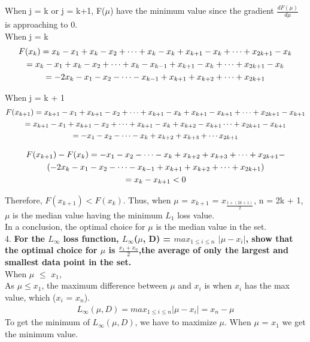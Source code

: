 \documentclass{article}
\begin{document}
When j = k or j = k+1, F($\mu$) have the minimum value since the gradient $\frac{dF(\mu)}{d\mu}$ is approaching to 0. \\

When j = k \begin{gather}
F(x_k) = x_k - x_1 + x_k - x_2 + \cdots + x_k - x_k + x_{k+1} - x_k + \cdots + x_{2k+1} - x_k \notag\\
= x_k - x_1 + x_k - x_2 + \cdots + x_k - x_{k-1} + x_{k+1} - x_k + \cdots + x_{2k+1} - x_k \notag\\
= -2x_k - x_1 - x_2 - \cdots - x_{k-1} + x_{k+1} + x_{k+2} + \cdots + x_{2k+1}
\end{gather}

When j = k + 1 \begin{gather}
F(x_{k+1}) = x_{k+1} - x_1 + x_{k+1} - x_2 + \cdots + x_{k+1} - x_{k} + x_{k+1} - x_{k+1} + \cdots + x_{2k+1} - x_{k+1} \notag\\
= x_{k+1} - x_1 + x_{k+1} - x_2 + \cdots + x_{k+1} - x_{k} + x_{k+2} - x_{k+1} \cdots + x_{2k+1} - x_{k+1} \notag\\
= -x_1 - x_2 -\cdots -x_k + x_{k+2} + x_{k+3} + \cdots x_{2k+1} 
\end{gather} 

\begin{gather}
F(x_{k+1}) - F(x_k) = -x_1 - x_2 -\cdots -x_k + x_{k+2} + x_{k+3} + \cdots + x_{2k+1}  - \notag\\(-2x_k - x_1 - x_2 - \cdots - x_{k-1} + x_{k+1} + x_{k+2}  + \cdots + x_{2k+1}) \\ = x_k - x_{k+1} <0
\end{gather}

Therefore, $F(x_{k+1}) < F(x_{k})$. Thus, when $\mu$ = $x_{k+1}$ = $x_{\frac{1+(2k+1)}{2}}$, n = 2k + 1, $\mu$ is the median value having the minimum $L_1$ loss value. \\
In a conclusion, the optimal choice for $\mu$ is the median value in the set.\\

4. \textbf{For the $L_{\infty}$ loss function, $L_{\infty}$($\mu$, D) = $max_{1 \leq i \leq n}$ $|\mu - x_i|$, show that the optimal choice for $\mu$ is $\frac{x_1+x_n}{2}$,the average of only the largest and smallest data point in the set.}\\

When $\mu$ $\leq$ $x_1$, \\
As $\mu \leq x_1$, the maximum difference between $\mu$ and $x_i$ is when $x_i$ has the max value, which ($x_i$ = $x_n$). 
\begin{gather}
L_{\infty} (\mu,D) = max_{1 \leq i \leq n} |\mu - x_i| = x_n - \mu
\end{gather}
To get the minimum of $L_{\infty} (\mu,D)$, we have to maximize $\mu$. When $\mu$ = $x_1$ we get the minimum value.\\
\end{document}
